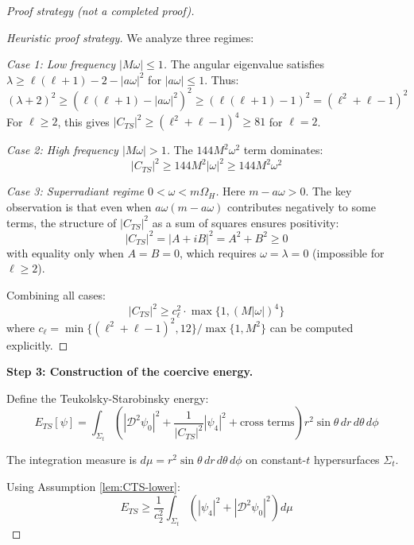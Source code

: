 \documentclass[12pt,a4paper]{article}
\begin{document}
\begin{proof}[Proof strategy (not a completed proof)]
\begin{proof}[Heuristic proof strategy]
We analyze three regimes:

\textit{Case 1: Low frequency $|M\omega| \leq 1$.}
The angular eigenvalue satisfies $\lambda \geq \ell(\ell+1) - 2 - |a\omega|^2$ for $|a\omega| \leq 1$. Thus:
\begin{equation}
(\lambda + 2)^2 \geq (\ell(\ell+1) - |a\omega|^2)^2 \geq \left(\ell(\ell+1) - 1\right)^2 = (\ell^2 + \ell - 1)^2
\end{equation}
For $\ell \geq 2$, this gives $|C_{TS}|^2 \geq (\ell^2 + \ell - 1)^4 \geq 81$ for $\ell = 2$.

\textit{Case 2: High frequency $|M\omega| > 1$.}
The $144M^2\omega^2$ term dominates:
\begin{equation}
|C_{TS}|^2 \geq 144M^2|\omega|^2 \geq 144 M^2 \omega^2
\end{equation}

\textit{Case 3: Superradiant regime $0 < \omega < m\Omega_H$.}
Here $m - a\omega > 0$. The key observation is that even when $a\omega(m - a\omega)$ contributes negatively to some terms, the structure of $|C_{TS}|^2$ as a sum of squares ensures positivity:
\begin{equation}
|C_{TS}|^2 = |A + iB|^2 = A^2 + B^2 \geq 0
\end{equation}
with equality only when $A = B = 0$, which requires $\omega = \lambda = 0$ (impossible for $\ell \geq 2$).

Combining all cases:
\begin{equation}
|C_{TS}|^2 \geq c_\ell^2 \cdot \max\{1, (M|\omega|)^4\}
\end{equation}
where $c_\ell = \min\{(\ell^2 + \ell - 1)^2, 12\} / \max\{1, M^2\}$ can be computed explicitly.
\end{proof}

\textbf{Step 3: Construction of the coercive energy.}

Define the Teukolsky-Starobinsky energy:
\begin{equation}
E_{TS}[\psi] = \int_{\Sigma_t} \left(|\mathcal{D}^2\psi_0|^2 + \frac{1}{|C_{TS}|^2}|\psi_4|^2 + \text{cross terms}\right) r^2 \sin\theta \, dr\, d\theta\, d\phi
\end{equation}

The integration measure is $d\mu = r^2 \sin\theta\, dr\, d\theta\, d\phi$ on constant-$t$ hypersurfaces $\Sigma_t$.

Using Assumption \ref{lem:CTS-lower}:
\begin{equation}
E_{TS} \geq \frac{1}{c_2^2}\int_{\Sigma_t} \left(|\psi_4|^2 + |\mathcal{D}^2\psi_0|^2\right) d\mu
\end{equation}


\end{proof}
\end{document}
